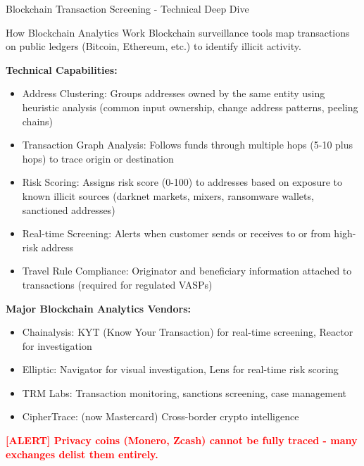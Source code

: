 \documentclass[11pt,a4paper]{beamer}
\newcommand{\redflag}[1]{\textcolor{red}{\textbf{[ALERT] #1}}}
\begin{document}
	\begin{frame}{Blockchain Transaction Screening - Technical Deep Dive}
		\begin{block}{How Blockchain Analytics Work}
			Blockchain surveillance tools map transactions on public ledgers (Bitcoin, Ethereum, etc.) to identify illicit activity.
		\end{block}
		
		\textbf{Technical Capabilities:}
		\begin{itemize}
			\item Address Clustering: Groups addresses owned by the same entity using heuristic analysis (common input ownership, change address patterns, peeling chains)
			\item Transaction Graph Analysis: Follows funds through multiple hops (5-10 plus hops) to trace origin or destination
			\item Risk Scoring: Assigns risk score (0-100) to addresses based on exposure to known illicit sources (darknet markets, mixers, ransomware wallets, sanctioned addresses)
			\item Real-time Screening: Alerts when customer sends or receives to or from high-risk address
			\item Travel Rule Compliance: Originator and beneficiary information attached to transactions (required for regulated VASPs)
		\end{itemize}
		
		\textbf{Major Blockchain Analytics Vendors:}
		\begin{itemize}
			\item Chainalysis: KYT (Know Your Transaction) for real-time screening, Reactor for investigation
			\item Elliptic: Navigator for visual investigation, Lens for real-time risk scoring
			\item TRM Labs: Transaction monitoring, sanctions screening, case management
			\item CipherTrace: (now Mastercard) Cross-border crypto intelligence
		\end{itemize}
		
		\redflag{Privacy coins (Monero, Zcash) cannot be fully traced - many exchanges delist them entirely.}
	\end{frame}
	
\end{document}
